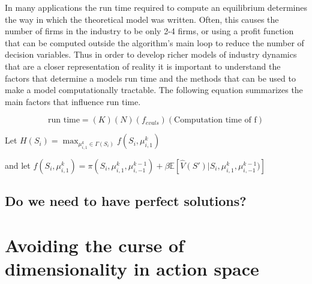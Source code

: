 \documentclass[12pt]{article}
\begin{document}
In many applications the run time required to compute an equilibrium determines the way in which the theoretical model was written. Often, this causes the number of firms in the industry to be only 2-4 firms, or using a profit function that can be computed outside the algorithm's main loop to reduce the number of decision variables. %
Thus in order to develop richer models of industry dynamics that are a closer representation of reality it is important to understand the factors that determine a models run time and the methods that can be used to make a model computationally tractable. The following equation summarizes the main factors that influence run time.

\begin{equation}
  \text{run time} = (K)(N)(f_{evals})(\text{Computation time of f})
\end{equation}

Let $H(S_i)=\max_{\mu^k_{i,1} \in \Gamma(S_i)}f(S_i,\mu^k_{i,1})$

and let $f(S_i,\mu^k_{i,1})=\pi(S_i, \mu^k_{i,1}, \mu^{k-1}_{i,-1})+ \beta\mathbb{E}[\hat{V}(S')|S_i,\mu^k_{i,1},\mu^{k-1}_{i,-1})]$

\subsection{Do we need to have perfect solutions?}


\section{Avoiding the curse of dimensionality in action space}
\end{document}
